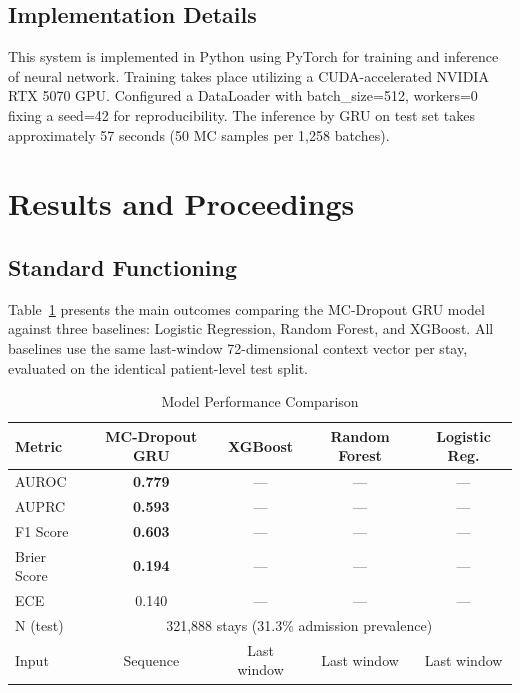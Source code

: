 \documentclass[conference]{IEEEtran}
\begin{document}
\subsection{Implementation Details}

This system is implemented in Python using PyTorch for training and inference of neural network. Training takes place utilizing a CUDA-accelerated NVIDIA RTX 5070 GPU. Configured a DataLoader with batch\_size=512, workers=0 fixing a seed=42 for reproducibility. The inference by GRU on test set takes approximately 57 seconds (50 MC samples per 1,258 batches).

\section{Results and Proceedings}

\subsection{Standard Functioning}

Table~\ref{tab:main_results} presents the main outcomes comparing the MC-Dropout GRU model against three baselines: Logistic Regression, Random Forest, and XGBoost. All baselines use the same last-window 72-dimensional context vector per stay, evaluated on the identical patient-level test split.

\begin{table}[h]
\caption{Model Performance Comparison}
\label{tab:main_results}
\centering
\begin{tabular}{lcccc}
\toprule
\textbf{Metric} & \textbf{MC-Dropout GRU} & \textbf{XGBoost} & \textbf{Random Forest} & \textbf{Logistic Reg.} \\
\midrule
AUROC & \textbf{0.779} & --- & --- & --- \\
AUPRC & \textbf{0.593} & --- & --- & --- \\
F1 Score & \textbf{0.603} & --- & --- & --- \\
Brier Score & \textbf{0.194} & --- & --- & --- \\
ECE & 0.140 & --- & --- & --- \\
\midrule
N (test) & \multicolumn{4}{c}{321,888 stays (31.3\% admission prevalence)} \\
Input & Sequence & Last window & Last window & Last window \\
\bottomrule
\end{tabular}
\end{table}
\end{document}
